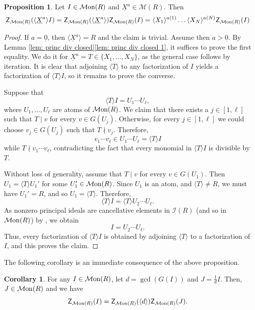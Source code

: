 \documentclass[a4paper,10pt,reqno]{amsart}
\theoremstyle{definition}
\newtheorem{proposition}[theorem]{Proposition}
\newtheorem{corollary}[theorem]{Corollary}
\theoremstyle{definition}
\providecommand\Mon{{\mathcal{M}{\rm on}}}
\begin{document}
\begin{proposition}\label{prop: princ factors}
    Let $I\in\Mon(R)$ and $\underline X^a\in \mathcal M(R)$. Then
    \[ \mathsf Z_{\Mon(R)} (\langle \underline X^a\rangle I) = \mathsf Z_{\Mon(R)}(\langle \underline X^a\rangle) \mathsf Z_{\Mon(R)}(I) = \langle X_1\rangle^{a(1)}\dots\langle X_N\rangle^{a(N)} \mathsf Z_{\Mon(R)}(I)\]
\end{proposition}
\begin{proof}
    If $a=\underline 0$, then $\langle \underline X^a\rangle=R$ and the claim is trivial. Assume then $a>\underline 0$. By Lemma \ref{lem: princ div closed}\ref{lem: princ div closed 1}, it suffices to prove the first equality. We do it for $\underline X^a = T\in\{X_1,\dots,X_N\}$, as the general case follows by iteration. It is clear that adjoining $\langle T\rangle$ to any factorization of $I$ yields a factorization of $\langle T\rangle I$, so it remains to prove the converse.

    Suppose that 
    \[\langle T\rangle I = U_1\cdots U_\ell,\]
    where $U_1,\dots,U_\ell$ are atoms of $\Mon(R)$. We claim that there exists a $j \in [1,\ell]$ such that $T\mid v$ for every $v\in G(U_j)$. Otherwise, for every $j\in[1,\ell]$ we could choose $v_j\in G(U_j)$ such that $T\nmid v_j$. Therefore,
    \[v_1\cdots v_\ell\in  U_1\cdots U_\ell=\langle T\rangle I\]
    while $T\nmid v_1\cdots v_\ell$, contradicting the fact that every monomial in $\langle T\rangle I$ is divisible by $T$. 

    Without loss of generality, assume that $T\mid v$ for every $v\in G(U_1)$. Then $U_1=\langle T\rangle U_1'$ for some $U_1'\in\Mon(R)$. Since $U_1$ is an atom, and $\langle T\rangle\ne R$, we must have $U_1'=R$, and so $U_1=\langle T\rangle$. Therefore,
    \[\langle T\rangle I = \langle T\rangle U_2\cdots U_\ell.\]
    As nonzero principal ideals are cancellative elements in $\mathcal I(R)$ (and so in $\Mon(R)$) by \cite{An-Ro97}, we obtain \[I = U_2\cdots U_\ell.\] Thus, every factorization of $\langle T\rangle I$ is obtained by adjoining $\langle T\rangle$ to a factorization of $I$, and this proves the claim.
\end{proof}

The following corollary is an immediate consequence of the above proposition.
\begin{corollary}
    For any $I\in\Mon(R)$, let $d=\gcd{(G(I))}$ and $J=\frac {1}{d} I$. Then, $J\in\Mon(R)$ and we have
    \[ \mathsf Z_{\Mon(R)}(I) = \mathsf Z_{\Mon(R)}(\langle d\rangle) \mathsf Z_{\Mon(R)}(J).  \]
\end{corollary}
\end{document}
